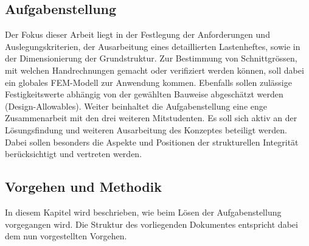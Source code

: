 \subsection{Aufgabenstellung}
\label{Aufgabenstellung}
Der Fokus dieser Arbeit liegt in der Festlegung der Anforderungen und Auslegungskriterien, der Ausarbeitung eines detaillierten Lastenheftes, sowie in der Dimensionierung der Grundstruktur. Zur Bestimmung von Schnittgrössen, mit welchen Handrechnungen gemacht oder verifiziert werden können, soll dabei ein globales FEM-Modell zur Anwendung kommen. Ebenfalls sollen zulässige Festigkeitswerte abhängig von der gewählten Bauweise abgeschätzt werden (Design-Allowables).
\newpage
Weiter beinhaltet die Aufgabenstellung eine enge Zusammenarbeit mit den drei weiteren Mitstudenten. Es soll sich aktiv an der Lösungsfindung und weiteren Ausarbeitung des Konzeptes beteiligt werden. Dabei sollen besonders die Aspekte und Positionen der strukturellen Integrität berücksichtigt und vertreten werden.

\subsection{Vorgehen und Methodik}
In diesem Kapitel wird beschrieben, wie beim Lösen der Aufgabenstellung vorgegangen wird. Die Struktur des vorliegenden Dokumentes entspricht dabei dem nun vorgestellten Vorgehen.

